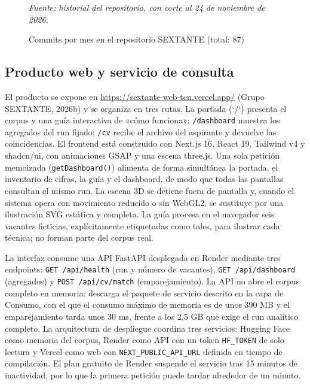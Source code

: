 \documentclass[journal]{IEEEtran}
\begin{document}
\begin{figure}[H]
\centering
{}
\caption{Commits por mes en el repositorio SEXTANTE (total: 87)}
\label{fig:commits}
\vspace{1pt}
{\footnotesize\textit{Fuente: historial del repositorio, con corte al 24 de noviembre de 2026.}}
\end{figure}

\subsection{Producto web y servicio de consulta}
El producto se expone en \url{https://sextante-web-ten.vercel.app/} (Grupo SEXTANTE, 2026b) y se organiza en tres rutas. La portada (`/`) presenta el corpus y una guía interactiva de «cómo funciona»; \texttt{/dashboard} muestra los agregados del run fijado; \texttt{/cv} recibe el archivo del aspirante y devuelve las coincidencias. El frontend está construido con Next.js 16, React 19, Tailwind v4 y shadcn/ui, con animaciones GSAP y una escena three.js. Una sola petición memoizada (\texttt{getDashboard()}) alimenta de forma simultánea la portada, el inventario de cifras, la guía y el dashboard, de modo que todas las pantallas consultan el mismo run. La escena 3D se detiene fuera de pantalla y, cuando el sistema opera con movimiento reducido o sin WebGL2, se sustituye por una ilustración SVG estática y completa. La guía procesa en el navegador seis vacantes ficticias, explícitamente etiquetadas como tales, para ilustrar cada técnica; no forman parte del corpus real.

La interfaz consume una API FastAPI desplegada en Render mediante tres endpoints: \texttt{GET /api/health} (run y número de vacantes), \texttt{GET /api/dashboard} (agregados) y \texttt{POST /api/cv/match} (emparejamiento). La API no abre el corpus completo en memoria: descarga el paquete de servicio descrito en la capa de Consumo, con el que el consumo máximo de memoria es de unos 390 MB y el emparejamiento tarda unos 30 ms, frente a los 2,5 GB que exige el run analítico completo. La arquitectura de despliegue coordina tres servicios: Hugging Face como memoria del corpus, Render como API con un token \texttt{HF\_TOKEN} de solo lectura y Vercel como web con \texttt{NEXT\_PUBLIC\_API\_URL} definida en tiempo de compilación. El plan gratuito de Render suspende el servicio tras 15 minutos de inactividad, por lo que la primera petición puede tardar alrededor de un minuto.
\end{document}
